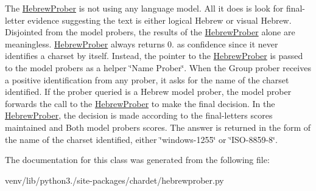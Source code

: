 The \hyperlink{classchardet_1_1hebrewprober_1_1_hebrew_prober}{Hebrew\+Prober} is not using any language model. All it does is look for final-\/letter evidence suggesting the text is either logical Hebrew or visual Hebrew. Disjointed from the model probers, the results of the \hyperlink{classchardet_1_1hebrewprober_1_1_hebrew_prober}{Hebrew\+Prober} alone are meaningless. \hyperlink{classchardet_1_1hebrewprober_1_1_hebrew_prober}{Hebrew\+Prober} always returns 0. as confidence since it never identifies a charset by itself. Instead, the pointer to the \hyperlink{classchardet_1_1hebrewprober_1_1_hebrew_prober}{Hebrew\+Prober} is passed to the model probers as a helper \char`\"{}\+Name Prober\char`\"{}. When the Group prober receives a positive identification from any prober, it asks for the name of the charset identified. If the prober queried is a Hebrew model prober, the model prober forwards the call to the \hyperlink{classchardet_1_1hebrewprober_1_1_hebrew_prober}{Hebrew\+Prober} to make the final decision. In the \hyperlink{classchardet_1_1hebrewprober_1_1_hebrew_prober}{Hebrew\+Prober}, the decision is made according to the final-\/letters scores maintained and Both model probers scores. The answer is returned in the form of the name of the charset identified, either \char`\"{}windows-\/1255\char`\"{} or \char`\"{}\+I\+S\+O-\/8859-\/8\char`\"{}. 

The documentation for this class was generated from the following file\+:\begin{DoxyCompactItemize}
\item 
venv/lib/python3./site-\/packages/chardet/hebrewprober.\+py\end{DoxyCompactItemize}
